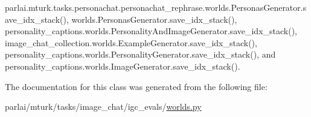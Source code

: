 parlai.\+mturk.\+tasks.\+personachat.\+personachat\+\_\+rephrase.\+worlds.\+Personas\+Generator.\+save\+\_\+idx\+\_\+stack(), worlds.\+Personas\+Generator.\+save\+\_\+idx\+\_\+stack(), personality\+\_\+captions.\+worlds.\+Personality\+And\+Image\+Generator.\+save\+\_\+idx\+\_\+stack(), image\+\_\+chat\+\_\+collection.\+worlds.\+Example\+Generator.\+save\+\_\+idx\+\_\+stack(), personality\+\_\+captions.\+worlds.\+Personality\+Generator.\+save\+\_\+idx\+\_\+stack(), and personality\+\_\+captions.\+worlds.\+Image\+Generator.\+save\+\_\+idx\+\_\+stack().



The documentation for this class was generated from the following file\+:\begin{DoxyCompactItemize}
\item 
parlai/mturk/tasks/image\+\_\+chat/igc\+\_\+evals/\hyperlink{parlai_2mturk_2tasks_2image__chat_2igc__evals_2worlds_8py}{worlds.\+py}\end{DoxyCompactItemize}
